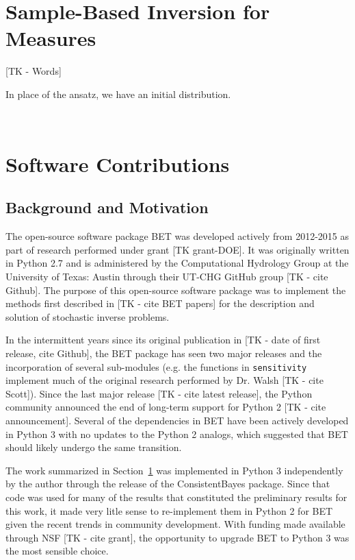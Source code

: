 


\
\section{Sample-Based Inversion for Measures}\label{sec:ch02-sample}
[TK - Words]

In place of the ansatz, we have an initial distribution.


\
\section{Software Contributions}

\subsection{Background and Motivation}
The open-source software package BET was developed actively from 2012-2015 as part of research performed under grant [TK grant-DOE].
It was originally written in Python 2.7 and is administered by the Computational Hydrology Group at the University of Texas: Austin through their UT-CHG GitHub group [TK - cite Github]. 
The purpose of this open-source software package was to implement the methods first described in [TK - cite BET papers] for the description and solution of stochastic inverse problems. 

In the intermittent years since its original publication in [TK - date of first release, cite Github], the BET package has seen two major releases and the incorporation of several sub-modules (e.g. the functions in {\tt sensitivity} implement much of the original research performed by Dr. Walsh [TK - cite Scott]). 
Since the last major release [TK - cite latest release], the Python community announced the end of long-term support for Python 2 [TK - cite announcement]. 
Several of the dependencies in BET have been actively developed in Python 3 with no updates to the Python 2 analogs, which suggested that BET should likely undergo the same transition.

The work summarized in Section~\ref{sec:ch02-sample} was implemented in Python 3 independently by the author through the release of the ConsistentBayes package.
Since that code was used for many of the results that constituted the preliminary results for this work, it made very litle sense to re-implement them in Python 2 for BET given the recent trends in community development. 
With funding made available through NSF [TK - cite grant], the opportunity to upgrade BET to Python 3 was the most sensible choice. 

